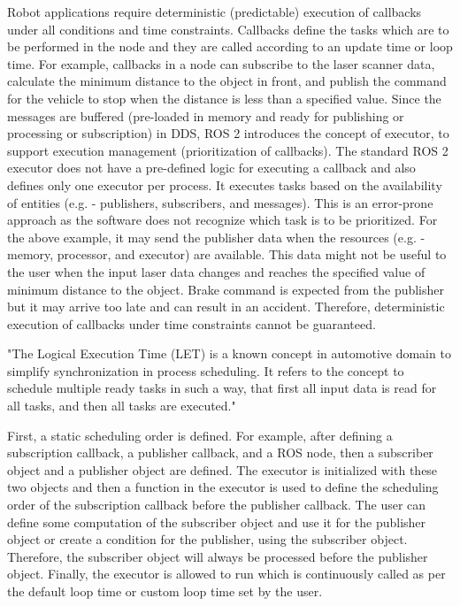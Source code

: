 \documentclass[%
xelatex,
	oneside,		%
	12pt,			%
	parskip=half,	%
	abstracton,
	chapterprefix=true%
    appendixprefix=true]
{scrbook}
\begin{document}
  
Robot applications require deterministic (predictable) execution of callbacks under all conditions and time constraints. Callbacks define the tasks which are to be performed in the node and they are called according to an update time or loop time. For example, callbacks in a node can subscribe to the laser scanner data, calculate the minimum distance to the object in front, and publish the command for the vehicle to stop when the distance is less than a specified value. Since the messages are buffered (pre-loaded in memory and ready for publishing or processing or subscription) in DDS, ROS 2 introduces the concept of executor, to support execution management (prioritization of callbacks). The standard ROS 2 executor does not have a pre-defined logic for executing a callback and also defines only one executor per process. It executes tasks based on the availability of entities (e.g. - publishers, subscribers, and messages). This is an error-prone approach as the software does not recognize which task is to be prioritized. For the above example, it may send the publisher data when the resources (e.g. - memory, processor, and executor) are available. This data might not be useful to the user when the input laser data changes and reaches the specified value of minimum distance to the object. Brake command is expected from the publisher but it may arrive too late and can result in an accident. Therefore, deterministic execution of callbacks under time constraints cannot be guaranteed.


"The Logical Execution Time (LET) is a known concept in automotive domain to simplify synchronization in process scheduling. It refers to the concept to schedule multiple ready tasks in such a way, that first all input data is read for all tasks, and then all tasks are executed."\cite{let}

First, a static scheduling order is defined. For example, after defining a subscription callback, a publisher callback, and a ROS node, then a subscriber object and a publisher object are defined. The executor is initialized with these two objects and then a function in the executor is used to define the scheduling order of the subscription callback before the publisher callback. The user can define some computation of the subscriber object and use it for the publisher object or create a condition for the publisher, using the subscriber object. Therefore, the subscriber object will always be processed before the publisher object. Finally, the executor is allowed to run which is continuously called as per the default loop time or custom loop time set by the user.
\end{document}
